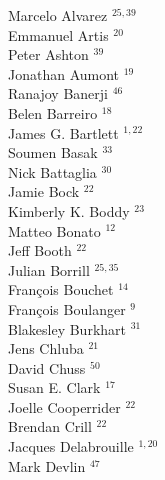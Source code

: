 \documentclass[PICOReport.tex]{subfiles}
\begin{document}
\footnotesize {

\begin{multicols}{4}
Marcelo Alvarez $^{25,39}$                 \\
Emmanuel Artis $^{20}$                  \\
Peter Ashton $^{39}$                    \\
Jonathan Aumont $^{19}$                 \\
Ranajoy Banerji $^{46}$                 \\
Belen Barreiro $^{18}$                  \\
James G. Bartlett $^{1,22}$               \\
Soumen Basak $^{33}$                    \\
Nick Battaglia $^{30}$                  \\
Jamie Bock $^{22}$                      \\
Kimberly K. Boddy $^{23}$               \\
Matteo Bonato $^{12}$                   \\
Jeff Booth $^{22}$                      \\
Julian Borrill $^{25,35}$                  \\
Fran\c{c}ois Bouchet $^{14}$            \\
Fran\c{c}ois Boulanger $^{9}$          \\
Blakesley Burkhart $^{31}$              \\
Jens Chluba $^{21}$                     \\
David Chuss $^{50}$                     \\
Susan E. Clark $^{17}$                  \\
Joelle Cooperrider $^{22}$              \\
Brendan Crill $^{22}$                   \\
Jacques Delabrouille $^{1,20}$            \\
Mark  Devlin $^{47}$                    \\

\end{multicols}}
\end{document}
